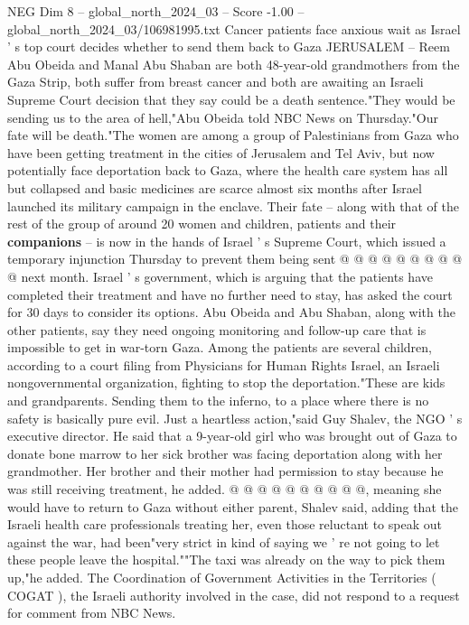 \begin{textsample}{NEG Dim 8 – global\_north\_2024\_03 – Score -1.00 – global\_north\_2024\_03/106981995.txt}  \label{ex:f8_neg_442}
Cancer patients face anxious wait as Israel ' s top court decides whether to send them back to Gaza JERUSALEM -- Reem Abu Obeida and Manal Abu Shaban are both 48-year-old grandmothers from the Gaza Strip, both suffer from breast cancer and both are awaiting an Israeli Supreme Court decision that they say could be a death sentence."They would be sending us to the area of hell,"Abu Obeida told NBC News on Thursday."Our fate will be death."The women are among a group of Palestinians from Gaza who have been getting treatment in the cities of Jerusalem and Tel Aviv, but now potentially face deportation back to Gaza, where the health care system has all but collapsed and basic medicines are scarce almost six months after Israel launched its military campaign in the enclave.
Their fate -- along with that of the rest of the group of around 20 women and children, patients and their \textbf{companions} -- is now in the hands of Israel ' s Supreme Court, which issued a temporary injunction Thursday to prevent them being sent @ @ @ @ @ @ @ @ @ @ next month.
Israel ' s government, which is arguing that the patients have completed their treatment and have no further need to stay, has asked the court for 30 days to consider its options.
Abu Obeida and Abu Shaban, along with the other patients, say they need ongoing monitoring and follow-up care that is impossible to get in war-torn Gaza.
Among the patients are several children, according to a court filing from Physicians for Human Rights Israel, an Israeli nongovernmental organization, fighting to stop the deportation."These are kids and grandparents.
Sending them to the inferno, to a place where there is no safety is basically pure evil.
Just a heartless action,"said Guy Shalev, the NGO ' s executive director.
He said that a 9-year-old girl who was brought out of Gaza to donate bone marrow to her sick brother was facing deportation along with her grandmother.
Her brother and their mother had permission to stay because he was still receiving treatment, he added. @ @ @ @ @ @ @ @ @ @, meaning she would have to return to Gaza without either parent, Shalev said, adding that the Israeli health care professionals treating her, even those reluctant to speak out against the war, had been"very strict in kind of saying we ' re not going to let these people leave the hospital.""The taxi was already on the way to pick them up,"he added.
The Coordination of Government Activities in the Territories ( COGAT ), the Israeli authority involved in the case, did not respond to a request for comment from NBC News.

\end{textsample}
